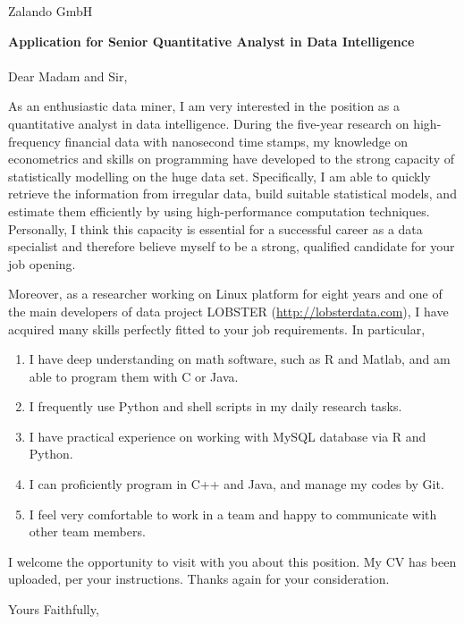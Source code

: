 \documentclass[a4paper, 11pt]{letter}
\begin{document}
 
\begin{letter}{%
Zalando GmbH} 
\opening{\textbf{\large{Application for Senior Quantitative Analyst in Data Intelligence}}\\
\vspace{-5pt}\\ Dear Madam and Sir,}
As an enthusiastic data miner, I am very interested in the position as a quantitative analyst in data intelligence. During the five-year research on high-frequency financial data with nanosecond time stamps, my knowledge on econometrics and skills on programming have developed to the strong capacity of statistically modelling on the huge data set. Specifically, I am able to quickly retrieve the information from irregular data, build suitable statistical models, and estimate them efficiently by using high-performance computation techniques. Personally, I think this capacity is essential for a successful career as a data specialist and therefore believe myself to be a strong, qualified candidate for your job opening.     

Moreover, as a researcher working on Linux platform for eight years and one of the main developers of data project LOBSTER (\url{http://lobsterdata.com}), I have acquired many skills perfectly fitted to your job requirements. In particular, 
\begin{enumerate}
  \item I have deep understanding on math software, such as R and Matlab, and am able to program them with C or Java.
  \item I frequently use Python and shell scripts in my daily research tasks.
  \item I have practical experience on working with MySQL database via R and Python.
  \item I can proficiently program in C++ and Java, and manage my codes by Git.
  \item I feel very comfortable to work in a team and happy to communicate with other team members.
\end{enumerate}
I welcome the opportunity to visit with you about this position. My CV has been uploaded, per your instructions. Thanks again for your consideration.
 
\closing{Yours Faithfully,}
 
 
\end{letter}
 
\end{document}
